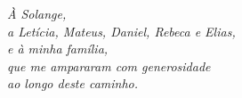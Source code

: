 \textit{%
À Solange,\\
a Letícia, Mateus, Daniel, Rebeca e Elias,\\
e à minha família,\\
que me ampararam com generosidade\\
ao longo deste caminho.%
}
